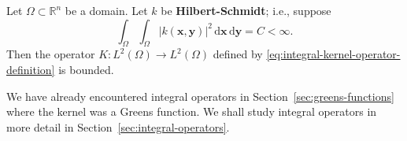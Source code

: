\begin{Lemma}
\label{lem:hilbert-schmidt-kernel-boundedness}
Let $\Omega\subset\mathbb{R}^n$ be a domain. Let $k$ be \textbf{Hilbert-Schmidt}; i.e., suppose
\begin{equation}\label{eq:hilbert-schmidt-kernel-square-integrability}
\int_{\Omega}\int_{\Omega}|k(\bm{x},\bm{y})|^2\,\mathrm{d}\bm{x}\,\mathrm{d}\bm{y}=C<\infty.
\end{equation}
Then the operator $K:L^2(\Omega)\to L^2(\Omega)$ defined by \eqref{eq:integral-kernel-operator-definition} is bounded.
\end{Lemma}

\begingroup
{}
\renewcommand{\endProof}{\par\nobreak\hfill$\blacksquare$\par\vspace{0.1cm}}
\endgroup

We have already encountered integral operators in Section~\ref{sec:greens-functions} where the kernel was a Green\textquotesingle s function. We shall study integral operators in more detail in Section~\ref{sec:integral-operators}.
